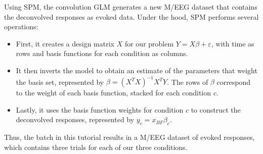 		Using SPM, the convolution GLM generates a new M/EEG dataset that contains the deconvolved responses as evoked data. Under the hood, SPM performs several operations: 
		\begin{itemize}
			\item First, it creates a design matrix $X$ for our problem $Y = X \beta + \varepsilon$, with time as rows and basis functions for each condition as columns.
			\item It then inverts the model to obtain an estimate of the parameters that weight the basis set, represented by $\beta = (X^TX)^{-1} X^T Y$. The rows of $\beta$ correspond to the weight of each basis function, stacked for each condition $c$.
			\item Lastly, it uses the basis function weights for condition $c$ to construct the deconvolved responses, represented by $y_c = x_{BF} \beta_c$.
		\end{itemize}

		Thus, the batch in this tutorial results in a M/EEG dataset of evoked responses, which contains three trials for each of our three conditions.

